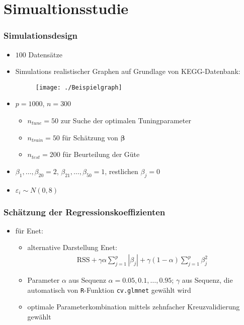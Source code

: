 \documentclass{beamer}
\begin{document}
\section{Simualtionsstudie}
\begin{frame}
	\frametitle{Simulationsdesign}
	\begin{itemize}
	\item $100$ Datensätze
	\item Simulations realistischer Graphen auf Grundlage von KEGG-Datenbank:
	\begin{figure}
	\centering
	\texttt{[image: ./Beispielgraph]}
	\label{fig:beispiel}
	\end{figure}
	\item $p=1000$, $n=300$ 
	\begin{itemize}
	\item $n_{tune}=50$ zur Suche der optimalen Tuningparameter
	\item $n_{train}=50$ für Schätzung von $\boldsymbol{\beta}$
	\item $n_{test}=200$ für Beurteilung der Güte
	\end{itemize}
	\item $\beta_1,\dots,\beta_{20}=2$, $\beta_{21},\dots,\beta_{50}=1$, restlichen $\beta_j=0$
	\item $\varepsilon_i \sim N(0,8)$  
	\end{itemize}
\end{frame}

\begin{frame}
	\frametitle{Schätzung der Regressionskoeffizienten}
	\begin{itemize}
	\item für Enet:
	\begin{itemize}
	\item alternative Darstellung Enet:
	\begin{align*}
	\text{RSS}+\gamma \alpha \sum_{j=1}^{p}|\beta_j| + \gamma (1-\alpha) \sum_{j=1}^{p}\beta_j^2
	\end{align*}
	\item Parameter $\alpha$ aus Sequenz $\alpha={0.05, 0.1, \dots ,0.95}$; $\gamma$ aus Sequenz, die automatisch von \texttt{R}-Funktion \texttt{cv.glmnet} gewählt wird 
	\item optimale Parameterkombination mittels zehnfacher Kreuzvalidierung gewählt
	\end{itemize}
	\end{itemize}
\end{frame}
\end{document}
